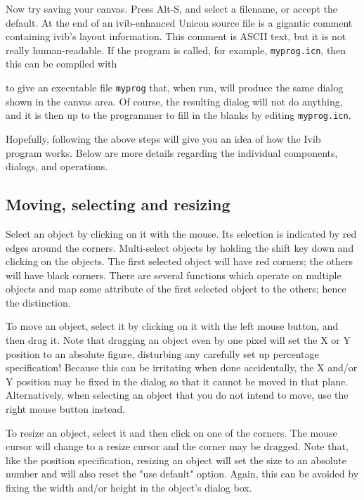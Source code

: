 Now try saving your canvas. Press Alt-S, and select a filename, or
accept the default. At the end of an ivib-enhanced Unicon source file
is a gigantic comment containing ivib's layout
information. This comment is ASCII text, but it is not
really human-readable. If the program is called, for example,
\texttt{myprog.icn}, then this can be compiled with


\noindent
to give an executable file \texttt{myprog} that, when run, will produce
the same dialog shown in the canvas area. Of course, the resulting
dialog will not do anything, and it is then up to the programmer to
fill in the blanks by editing \texttt{myprog.icn}.

Hopefully, following the above steps will give you an idea of how the
Ivib program works. Below are more details regarding the individual
components, dialogs, and operations.

\subsection*{Moving, selecting and resizing}

Select an object by clicking on it with the mouse. Its selection is
indicated by red edges around the corners. Multi-select objects by
holding the shift key down and clicking on the objects. The first
selected object will have red corners; the others will have black
corners. There are several functions which operate on multiple objects
and map some attribute of the first selected object to the others;
hence the distinction.

To move an object, select it by clicking on it with the left mouse
button, and then drag it. Note that dragging an object even by one
pixel will set the X or Y position to an absolute figure, disturbing
any carefully set up percentage specification! Because this can be
irritating when done accidentally, the X and/or Y position may be fixed
in the dialog so that it cannot be moved in that plane. Alternatively,
when selecting an object that you do not intend to move, use the right
mouse button instead.

To resize an object, select it and then click on one of the corners. The
mouse cursor will change to a resize cursor and the corner may be
dragged. Note that, like the position specification, resizing an object
will set the size to an absolute number and will also reset the
"use default" option. Again, this can be
avoided by fixing the width and/or height in the object's dialog box.

